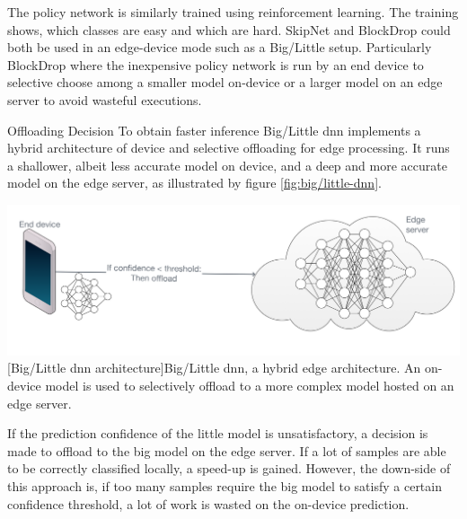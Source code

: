 \begin{enumdescript}
	The policy network is similarly trained using reinforcement learning. The training shows, which classes are easy and which are hard. SkipNet and BlockDrop could both be used in an edge-device mode such as a Big/Little \cite{park_big/little_2015} setup. Particularly BlockDrop where the inexpensive policy network is run by an end device to selective choose among a smaller model on-device or a larger model on an edge server to avoid wasteful executions.

	\item[Offloading Decision] To obtain faster inference Big/Little \gls{dnn} \cite{park_big/little_2015} implements a hybrid architecture of device and selective offloading for edge processing. It runs a shallower, albeit less accurate model on device, and a deep and more accurate model on the edge server, as illustrated by figure \ref{fig:big/little-dnn}. 

	\begin{minipage}[t]{\linewidth}    
		\centering                          
		\includegraphics[width=.8\linewidth]{figures/models/big_little_dnn}
		[Big/Little \gls{dnn} architecture]{Big/Little \gls{dnn}, a hybrid edge architecture. An on-device model is used to selectively offload to a more complex model hosted on an edge server.}
		\label{fig:big/little-dnn}
	\end{minipage}
	
	If the prediction confidence of the little model is unsatisfactory, a decision is made to offload to the big model on the edge server. If a lot of samples are able to be correctly classified locally, a speed-up is gained. However, the down-side of this approach is, if too many samples require the big model to satisfy a certain confidence threshold, a lot of work is wasted on the on-device prediction. 


\end{enumdescript}

